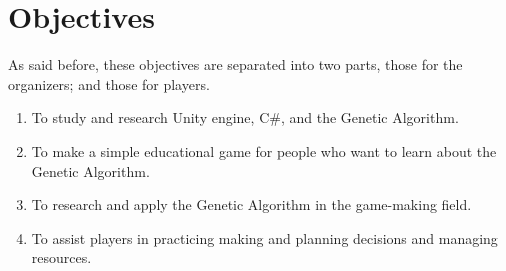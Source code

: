 \documentclass[12pt,oneside,openright,a4paper]{cpe-english-project}
\begin{document}
%
%


\section{Objectives}
As said before, these objectives are separated into two parts, those for the organizers; and those for players.
\begin{enumerate}
	\item To study and research Unity engine, C\#, and the Genetic Algorithm.
	\item To make a simple educational game for people who want to learn about the Genetic Algorithm.
	\item To research and apply the Genetic Algorithm in the game-making field.
	\item To assist players in practicing making and planning decisions and managing resources.
\end{enumerate}


\end{document}
